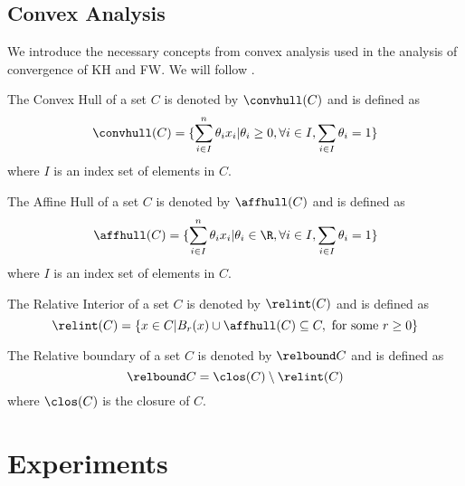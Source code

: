 \section{Convex Analysis}
We introduce the necessary concepts from convex analysis used in the analysis of
convergence of KH and FW. We will follow \citep{boyd04_convex}.

\begin{definition}
  \label{def:conv-hull}
  The Convex Hull of a set \(C\) is denoted by \(\convhull(C)\) and is defined as
  \begin{equation}
    \label{eq:conv-hull}
    \convhull(C) = \{ \sum_{i \in I}^n \theta_{i} x_i | \theta_i \geq 0, \forall i \in I, \sum_{i \in I} \theta_i = 1 \}
  \end{equation}
  where \(I\) is an index set of elements in \(C\).
\end{definition}

\begin{definition}
  \label{def:aff-hull}
  The Affine Hull of a set \(C\) is denoted by \(\affhull(C)\) and is defined as
  \begin{equation}
    \label{eq:aff-hull}
    \affhull(C) = \{ \sum_{i \in I}^n \theta_{i} x_i | \theta_i \in \R, \forall i \in I, \sum_{i \in I} \theta_i = 1 \}
  \end{equation}
  where \(I\) is an index set of elements in \(C\).
\end{definition}

\begin{definition}
  \label{def:relative-interior}
  The Relative Interior of a set \(C\) is denoted by \(\relint(C)\) and is defined as
  \begin{equation}
    \label{eq:relative-interior}
    \relint(C) = \{x \in C | B_{r}(x) \cup \affhull(C) \subseteq C, \text{ for some } r \geq 0\}
  \end{equation}
\end{definition}

\begin{definition}
  \label{def:relative-boundary}
  The Relative boundary of a set \(C\) is denoted by \(\relbound C\) and is defined as
  \begin{equation}
    \label{eq:relative-boundary}
    \relbound C = \clos(C) \setminus \relint(C)
  \end{equation}
  where \(\clos(C)\) is the closure of \(C\).
\end{definition}

\chapter{Experiments}
